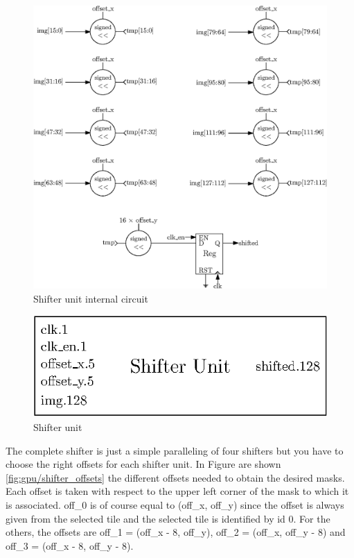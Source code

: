 \begin{figure}[H]
    \centering
    \includegraphics[width=\linewidth]{Chapter4-GPU_CLKU/res/shifter_unit_in}
    \caption{Shifter unit internal circuit}
    \label{fig:gpu/shifter_unit_in}
\end{figure}

\begin{figure}[H]
    \centering
    \includegraphics[scale=0.8]{Chapter4-GPU_CLKU/res/shifter_unit}
    \caption{Shifter unit}
    \label{fig:gpu/shifter_unit}
\end{figure}

The complete shifter is just a simple paralleling of four shifters but you have to choose the right 
offsets for each shifter unit. In Figure are shown \ref{fig:gpu/shifter_offsets}
the different offsets needed to obtain the desired masks. Each offset is taken with respect to the 
upper left corner of the mask to which it is associated. off\_0 is of course equal to 
(off\_x, off\_y) since the offset is always given from the selected tile and the selected tile is 
identified by id 0. For the others, the offsets are off\_1 = (off\_x - 8, off\_y), off\_2 = 
(off\_x, off\_y - 8) and off\_3 = (off\_x - 8, off\_y - 8).

